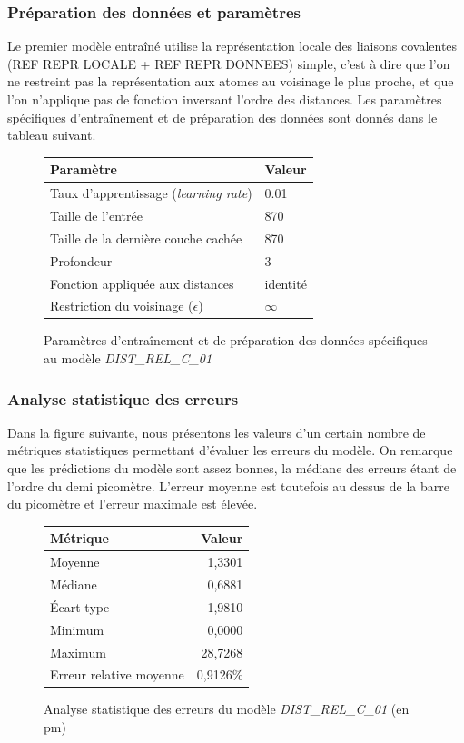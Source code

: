 \subsubsection{Préparation des données et paramètres}
Le premier modèle entraîné utilise la représentation locale des liaisons covalentes (REF REPR LOCALE + REF REPR DONNEES) simple, c'est à dire que l'on ne restreint pas la représentation aux atomes au voisinage le plus proche, et que l'on n'applique pas de fonction inversant l'ordre des distances. Les paramètres spécifiques d'entraînement et de préparation des données sont donnés dans le tableau suivant.


\begin{figure}[!h]
	\centering
	\begin{tabular}{|l|l|}
		\hline
		\textbf{Paramètre} & \textbf{Valeur} \\ \hline
		Taux d'apprentissage (\emph{learning rate}) & 0.01 \\ \hline
		Taille de l'entrée & 870 \\ \hline
		Taille de la dernière couche cachée & 870 \\ \hline
		Profondeur & 3 \\ \hline
		Fonction appliquée aux distances & identité \\ \hline
		Restriction du voisinage ($\epsilon$) & $\infty$ \\ \hline
	\end{tabular}

	\caption{Paramètres d'entraînement et de préparation des données spécifiques au modèle \emph{DIST\_REL\_C\_01}}
\end{figure}

\subsubsection{Analyse statistique des erreurs}
\par Dans la figure suivante, nous présentons les valeurs d'un certain nombre de métriques statistiques permettant d'évaluer les erreurs du modèle. On remarque que les prédictions du modèle sont assez bonnes, la médiane des erreurs étant de l'ordre du demi picomètre. L'erreur moyenne est toutefois au dessus de la barre du picomètre et l'erreur maximale est élevée.

\begin{figure}[!h]
	\centering
	\begin{tabular}{|l|r|}
		\hline
		\textbf{Métrique} & \textbf{Valeur} \\ \hline
		Moyenne & 1,3301 \\ \hline
		Médiane & 0,6881 \\ \hline
		Écart-type & 1,9810 \\ \hline
		Minimum & 0,0000 \\ \hline
		Maximum & 28,7268\\ \hline
		Erreur relative moyenne & 0,9126\% \\ \hline
	\end{tabular}
	
	\caption{Analyse statistique des erreurs du modèle \emph{DIST\_REL\_C\_01} (en pm)}
\end{figure}

